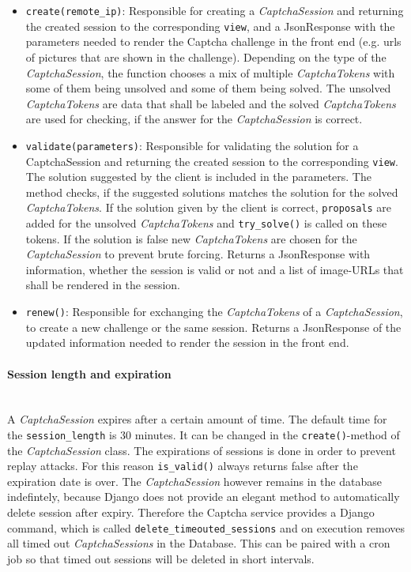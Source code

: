 \begin{itemize}
\item \verb|create(remote_ip)|: Responsible for creating a \emph{CaptchaSession} and returning the created session to the corresponding \verb|view|, and a JsonResponse with the parameters needed to render the Captcha challenge in the front end (e.g. urls of pictures that are shown in the challenge). Depending on the type of the \emph{CaptchaSession}, the function chooses a mix of multiple \emph{CaptchaTokens} with some of them being unsolved and some of them being solved. The unsolved \emph{CaptchaTokens} are data that shall be labeled and the solved \emph{CaptchaTokens} are used for checking, if the answer for the \emph{CaptchaSession} is correct. 
\item \verb|validate(parameters)|: Responsible for validating the solution for a CaptchaSession and returning the created session to the corresponding \verb|view|. The solution suggested by the client is included in the parameters. The method checks, if the suggested solutions matches the solution for the solved \emph{CaptchaTokens}. If the solution given by the client is correct, \verb|proposals| are added for the unsolved \emph{CaptchaTokens} and \verb|try_solve()| is called on these tokens. If the solution is false new \emph{CaptchaTokens} are chosen for the \emph{CaptchaSession} to prevent brute forcing. Returns a JsonResponse with information, whether the session is valid or not and a list of image-URLs that shall be rendered in the session.
\item \verb|renew()|: Responsible for exchanging the \emph{CaptchaTokens} of a \emph{CaptchaSession}, to create a new challenge or the same session. Returns a JsonResponse of the updated information needed to render the session in the front end.
\end{itemize}

\clearpage
\paragraph{Session length and expiration} \mbox{} \\

A \emph{CaptchaSession} expires after a certain amount of time. The default time for the \verb|session_length| is 30 minutes. It can be changed in the \verb|create()|-method of the \emph{CaptchaSession} class. The expirations of sessions is done in order to prevent replay attacks. For this reason \verb|is_valid()| always returns false after the expiration date is over. The \emph{CaptchaSession} however remains in the database indefintely, because Django does not provide an elegant method to automatically delete session after expiry. Therefore the Captcha service provides a Django command, which is called \verb|delete_timeouted_sessions| and on execution removes all timed out \emph{CaptchaSessions} in the Database. This can be paired with a cron job so that timed out sessions will be deleted in short intervals. 

